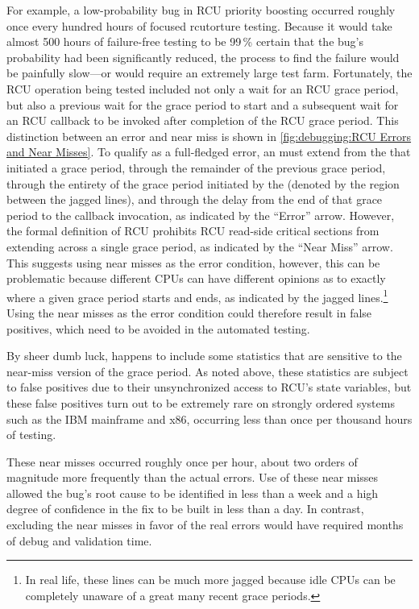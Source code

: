 For example, a low-probability bug in RCU priority boosting occurred
roughly once every hundred hours of focused rcutorture testing.
Because it would take almost 500 hours of failure-free testing to be
99\,\% certain that the bug's probability had been significantly reduced,
the  process
to find the failure would be painfully slow---or would require an extremely
large test farm.
Fortunately, the RCU operation being tested included not only a wait for
an RCU grace period, but also a previous wait for the grace period to start
and a subsequent wait for an RCU callback to be
invoked after completion of the RCU grace period.
This distinction between an  error and near miss is
shown in
\cref{fig:debugging:RCU Errors and Near Misses}.
To qualify as a full-fledged error, an 
must extend from the  that initiated a grace period,
through the remainder of the previous grace period, through the
entirety of the grace period initiated by the 
(denoted by the region between the jagged lines), and
through the delay from the end of that grace period to the callback
invocation, as indicated by the ``Error'' arrow.
However, the formal definition of RCU prohibits RCU read-side critical
sections from extending across a single grace period, as indicated by
the ``Near Miss'' arrow.
This suggests using near misses as the error condition, however, this
can be problematic because different CPUs can have different opinions
as to exactly where a given
grace period starts and ends, as indicated by the jagged lines.\footnote{
	In real life, these lines can be much more jagged because idle
	CPUs can be completely unaware of a great many recent grace
	periods.}
Using the near misses as the error condition could therefore result
in false positives, which need to be avoided in the automated
 testing.

By sheer dumb luck,  happens to include some statistics that
are sensitive to the near-miss version of the grace period.
As noted above, these statistics are subject to false positives due to
their unsynchronized access to RCU's state variables,
but these false positives turn out to be extremely rare on strongly
ordered systems such as the IBM mainframe and x86, occurring less than
once per thousand hours of testing.

These near misses occurred roughly once per hour, about two orders of
magnitude more frequently than the actual errors.
Use of these near misses allowed the bug's root cause to be identified
in less than a week and a high degree of confidence in the fix to be
built in less than a day.
In contrast, excluding the near misses in favor of the real errors would
have required months of debug and validation time.

